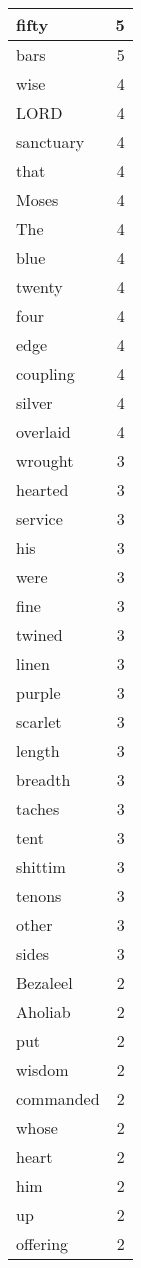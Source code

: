 \begin{center}
\begin{longtable}{l|r}
fifty & 5 \\ \hline
bars & 5 \\ \hline
wise & 4 \\ \hline
LORD & 4 \\ \hline
sanctuary & 4 \\ \hline
that & 4 \\ \hline
Moses & 4 \\ \hline
The & 4 \\ \hline
blue & 4 \\ \hline
twenty & 4 \\ \hline
four & 4 \\ \hline
edge & 4 \\ \hline
coupling & 4 \\ \hline
silver & 4 \\ \hline
overlaid & 4 \\ \hline
wrought & 3 \\ \hline
hearted & 3 \\ \hline
service & 3 \\ \hline
his & 3 \\ \hline
were & 3 \\ \hline
fine & 3 \\ \hline
twined & 3 \\ \hline
linen & 3 \\ \hline
purple & 3 \\ \hline
scarlet & 3 \\ \hline
length & 3 \\ \hline
breadth & 3 \\ \hline
taches & 3 \\ \hline
tent & 3 \\ \hline
shittim & 3 \\ \hline
tenons & 3 \\ \hline
other & 3 \\ \hline
sides & 3 \\ \hline
Bezaleel & 2 \\ \hline
Aholiab & 2 \\ \hline
put & 2 \\ \hline
wisdom & 2 \\ \hline
commanded & 2 \\ \hline
whose & 2 \\ \hline
heart & 2 \\ \hline
him & 2 \\ \hline
up & 2 \\ \hline
offering & 2 \\ \hline

\end{longtable}
\end{center}
